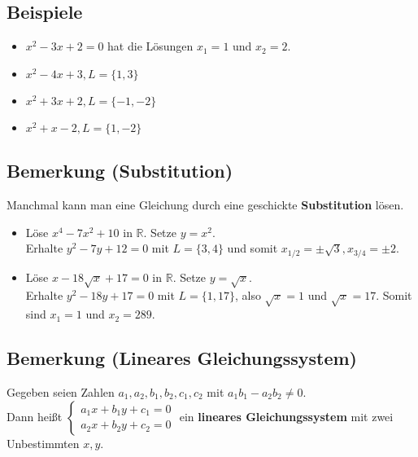 	
\subsection{Beispiele}

	\begin{itemize}
	\item $x^2-3x+2=0$ hat die Lösungen $x_1=1$ und $x_2=2$.
	\item $x^2-4x+3, L=\{1,3\}$
	\item $x^2+3x+2, L=\{-1,-2\}$
	\item $x^2+x-2, L=\{1,-2\}$
	\end{itemize}
	
	
\subsection[Substitution]{Bemerkung (Substitution)}

	Manchmal kann man eine Gleichung durch eine geschickte \textbf{Substitution} lösen.
	
	\begin{itemize}
	\item 	Löse $x^4-7x^2+10$ in $\mathbb{R}$. Setze $y=x^2$.\\
			Erhalte $y^2-7y+12=0$ mit $L=\{3,4\}$ und somit $x_{1/2}=\pm \sqrt{3}, x_{3/4}=\pm 2$.
			
	\item	Löse $x-18\sqrt{x}+17=0$ in $\mathbb{R}$. Setze $y=\sqrt{x}$.\\
			Erhalte $y^2-18y+17=0$ mit $L=\{1,17\}$, also $\sqrt{x}=1$ und $\sqrt{x}=17$.
			Somit sind $x_1=1$ und $x_2=289$.
		
	\end{itemize}
	
	
\subsection[Lineare Gleichungssysteme]{Bemerkung (Lineares Gleichungssystem)}

	Gegeben seien Zahlen $a_1,a_2,b_1,b_2,c_1,c_2$ mit $a_1 b_1-a_2 b_2 \neq 0$.\\
	Dann heißt $\left\{  \begin{array}{l}
                  			a_1x+b_1 y+c_1=0\\
                  			a_2x+b_2 y+c_2=0
                			\end{array}
                \right.$ ein \textbf{lineares Gleichungssystem} mit zwei Unbestimmten $x,y$.
                
